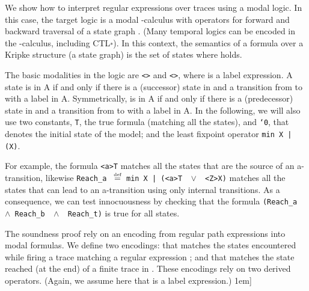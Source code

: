 \documentclass[a4paper]{scrartcl}
\def\vars#1{\textsf{\small #1}}
\newcommand{\eqdef}{\ensuremath{\overset{\text{\tiny def}}{=}}}
\newcommand{\kleene}{\ensuremath{\mathclose{\overset{*}{\ }}}}
\newcommand{\ltl}[1]{\texttt{#1}}
\newcommand{\ltland}{\,\ensuremath{\wedge}\,}\newcommand{\ltlo}{\,\ensuremath{\text{\texttt{o}}}\,}\newcommand{\ltls}{\,\ensuremath{\text{\texttt{*}}}\,}\newcommand{\ltlU}{\,\ensuremath{\text{\texttt{U}}}\,}\newcommand{\ltlwand}{\,\ensuremath{\text{\texttt{-*}}}\,}\newcommand{\ltlor}{\,\ensuremath{\vee}\,}\newcommand{\kirc}{\mathrel{\circ}}
\begin{document}
We show how to interpret regular expressions over traces using a modal
logic. In this case, the target logic is a modal -calculus with
operators for forward and backward traversal of a state graph . (Many
temporal logics can be encoded in the -calculus, including
CTL\kleene). In this context, the semantics of a formula  over a
Kripke structure (a state graph) is the set of states where 
holds.


The basic modalities in the logic are \ltl{<>} and
\ltl{<>}, where  is a label expression.  A state  is in
A if and only if there is a (successor) state
 in  and a transition from  to  with a label in
A. Symmetrically,  is in A if and only if
there is a (predecessor) state  in  and a transition from
 to  with a label in A. In the following, we will also use two
constants, \ltl{T}, the true formula (matching all the states), and
\ltl{`0}, that denotes the initial state of the model; and the least
fixpoint operator \ltl{min X | (X)}.

For example, the formula \ltl{<\vars{a}>T} matches all the states that
are the source of an \vars{a}-transition, likewise
\ltl{Reach\_\vars{a}} \ \eqdef\ \ltl{min X\,|\,(<\vars{a}>T \ltlor
  <Z>X)} matches all the states that can lead to an
\vars{a}-transition using only internal transitions. As a consequence,
we can test innocuousness by checking that the formula
\ltl{(Reach\_\vars{a} \ltland Reach\_\vars{b} \ltland
  Reach\_\vars{t})} is true for all states.

The soundness proof rely on an encoding from regular path expressions
into modal formulas. We define two encodings:  that
matches the states encountered while firing a trace matching a regular
expression ; and  that matches the state reached (at
the end) of a finite trace in . These encodings rely on two derived
operators. (Again, we assume here that  is a label expression.)
1em]
\end{document}
